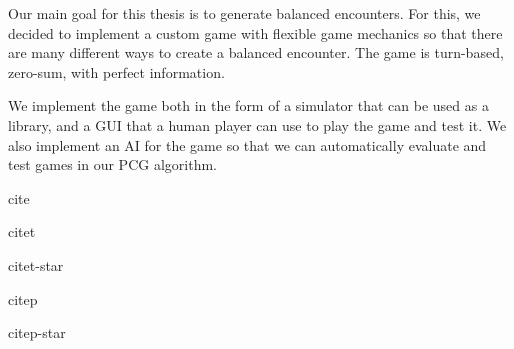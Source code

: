 Our main goal for this thesis is to generate balanced encounters. For this, we
decided to implement a custom game with flexible game mechanics so that there
are many different ways to create a balanced encounter. The game is turn-based,
zero-sum, with perfect information.  

We implement the game both in the form of a simulator that can be used as a
library, and a GUI that a human player can use to play the game and test it. We
also implement an AI for the game so that we can automatically evaluate and
test games in our PCG algorithm.


cite \cite{Genberget08}

citet \citet{Genberget08}

citet-star \citet*{Genberget08}

citep \citep{Genberget08}

citep-star \citep*{Genberget08}

